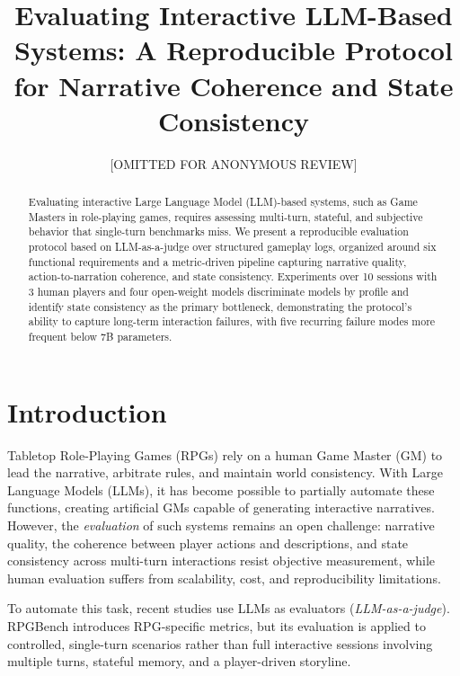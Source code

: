 \documentclass[12pt]{article}
\title{Evaluating Interactive LLM-Based Systems: A Reproducible Protocol for Narrative Coherence and State Consistency}
\author{[OMITTED FOR ANONYMOUS REVIEW]}
\begin{document}
\maketitle

\thispagestyle{plain}

\begin{abstract}
Evaluating interactive Large Language Model (LLM)-based systems, such as Game Masters in role-playing games, requires assessing multi-turn, stateful, and subjective behavior that single-turn benchmarks miss. We present a reproducible evaluation protocol based on LLM-as-a-judge over structured gameplay logs, organized around six functional requirements and a metric-driven pipeline capturing narrative quality, action-to-narration coherence, and state consistency. Experiments over 10 sessions with 3 human players and four open-weight models discriminate models by profile and identify state consistency as the primary bottleneck, demonstrating the protocol's ability to capture long-term interaction failures, with five recurring failure modes more frequent below 7B parameters.
\end{abstract}


\section{Introduction}

Tabletop Role-Playing Games (RPGs) rely on a human Game Master (GM) to lead the narrative, arbitrate rules, and maintain world consistency. With Large Language Models (LLMs), it has become possible to partially automate these functions, creating artificial GMs capable of generating interactive narratives. However, the \textit{evaluation} of such systems remains an open challenge: narrative quality, the coherence between player actions and descriptions, and state consistency across multi-turn interactions resist objective measurement, while human evaluation suffers from scalability, cost, and reproducibility limitations.

To automate this task, recent studies use LLMs as evaluators (\textit{LLM-as-a-judge}). RPGBench \cite{yu:2025} introduces RPG-specific metrics, but its evaluation is applied to controlled, single-turn scenarios rather than full interactive sessions involving multiple turns, stateful memory, and a player-driven storyline.
\end{document}
